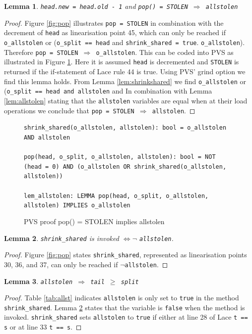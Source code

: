 \documentclass{sig-alternate-br}
\newtheorem{lemma}{Lemma}
\begin{document}
\begin{lemma}
	\texttt{head.new = head.old - 1} and \texttt{pop() = STOLEN $\Rightarrow$ \texttt{allstolen}}
\end{lemma}
\begin{proof}
	Figure \ref{fig:pop} illustrates \texttt{pop = STOLEN} in combination with the decrement of \texttt{head} as linearisation point 45, which can only be reached if \texttt{o\_allstolen} or (\texttt{o\_split == head} and \texttt{shrink\_shared = true}.
	\texttt{o\_allstolen}). Therefore \texttt{pop = STOLEN $\Rightarrow$ o\_allstolen}. This can be coded into PVS as illustrated in Figure \ref{pvs:popallstolen}. Here it is assumed \texttt{head} is decremented and \texttt{STOLEN} is returned if the if-statement of Lace rule 44 is true. Using PVS' grind option we find this lemma holds. From Lemma \ref{lem:shrinkshared} we find \texttt{o\_allstolen} or (\texttt{o\_split == head and allstolen} and
	In combination with Lemma \ref{lem:allstolen} stating that the \texttt{allstolen} variables are equal when at their load operations we conclude that \texttt{pop = STOLEN $\Rightarrow$ allstolen}.
\end{proof}
\begin{figure}[h]
	\texttt{shrink\_shared(o\_allstolen, allstolen): bool = o\_allstolen AND allstolen}\\\\
	\texttt{pop(head, o\_split, o\_allstolen, allstolen): bool = NOT (head = 0) AND (o\_allstolen OR shrink\_shared(o\_allstolen, allstolen))}\\\\
	\texttt{lem\_allstolen: LEMMA pop(head, o\_split, o\_allstolen, allstolen) IMPLIES o\_allstolen}
	\caption{PVS proof pop() = STOLEN implies allstolen}
	\label{pvs:popallstolen}
\end{figure}

\begin{lemma}
	\texttt{shrink\_shared} is invoked $\iff \neg$ \texttt{allstolen}.
	\label{lem:shrinkallstolen}
\end{lemma}
\begin{proof}
	Figure \ref{fig:pop} states \texttt{shrink\_shared}, represented as linearisation points 30, 36, and 37, can only be reached if $\neg$\texttt{allstolen}.
\end{proof}

\begin{lemma}
	\texttt{allstolen $\Rightarrow$ tail $\geq$ split}
\end{lemma}
\begin{proof}
	Table \ref{tab:allst} indicates \texttt{allstolen} is only set to \texttt{true} in the method \texttt{shrink\_shared}.
	Lemma \ref{lem:shrinkallstolen} states that the variable is \texttt{false} when the method is invoked.
	\texttt{shrink\_shared} sets \texttt{allstolen} to \texttt{true} if either at line 28 of Lace \texttt{t == s} or at line 33 \texttt{t == s}.
\end{proof}
\end{document}
